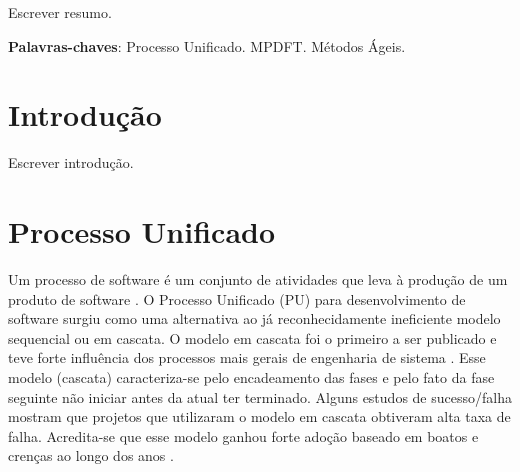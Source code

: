 \documentclass[
	article,			%
	11pt,				%
	oneside,			%
	a4paper,			%
	english,			%
	brazil,				%
	sumario=tradicional
	]{abntex2}
\begin{document}
\frenchspacing 


%
%
\maketitle

\begin{resumoumacoluna}
 
 Escrever resumo.

 \vspace{\onelineskip}
 
 \noindent
 \textbf{Palavras-chaves}: Processo Unificado. MPDFT. Métodos Ágeis.
\end{resumoumacoluna}


\textual

\section*{Introdução}

Escrever introdução.

\section{Processo Unificado}

Um processo de software é um conjunto de atividades que leva à produção de um
produto de software \cite{sommerville2007}. O Processo Unificado (PU) para
desenvolvimento de software surgiu como uma alternativa ao já reconhecidamente
ineficiente modelo sequencial ou em cascata. O modelo em cascata foi o primeiro
a ser publicado e teve forte influência dos processos mais gerais de engenharia de
sistema \cite{sommerville2007}. Esse modelo (cascata) caracteriza-se pelo
encadeamento das fases e pelo fato da fase seguinte não iniciar antes da atual
ter terminado. Alguns estudos de sucesso/falha mostram que projetos que
utilizaram o modelo em cascata obtiveram alta taxa de falha. Acredita-se que
esse modelo ganhou forte adoção baseado em boatos e crenças ao longo dos anos
\cite{larman2007utilizando}.
\end{document}
